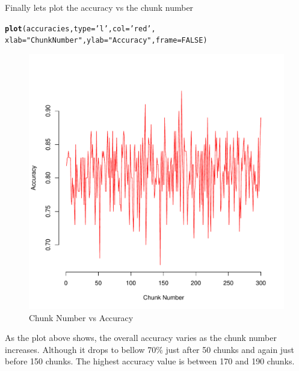 \documentclass[10pt  ,usenames, dvipsnames]{article}\usepackage[]{graphicx}\usepackage[]{color}
\makeatletter
\def\maxwidth{ %
  \ifdim\Gin@nat@width>\linewidth
    \linewidth
  \else
    \Gin@nat@width
  \fi
}
\newcommand{\hlnum}[1]{\textcolor[rgb]{0.686,0.059,0.569}{#1}}%
\newcommand{\hlstr}[1]{\textcolor[rgb]{0.192,0.494,0.8}{#1}}%
\newcommand{\hlstd}[1]{\textcolor[rgb]{0.345,0.345,0.345}{#1}}%
\newcommand{\hlkwc}[1]{\textcolor[rgb]{0.333,0.667,0.333}{#1}}%
\newcommand{\hlkwd}[1]{\textcolor[rgb]{0.737,0.353,0.396}{\textbf{#1}}}%
\newenvironment{kframe}{%
 \def\at@end@of@kframe{}%
 \ifinner\ifhmode%
  \def\at@end@of@kframe{\end{minipage}}%
  \begin{minipage}{\columnwidth}%
 \fi\fi%
 \def\FrameCommand##1{\hskip\@totalleftmargin \hskip-\fboxsep
 \colorbox{shadecolor}{##1}\hskip-\fboxsep
     \hskip-\linewidth \hskip-\@totalleftmargin \hskip\columnwidth}%
 \MakeFramed {\advance\hsize-\width
   \@totalleftmargin\z@ \linewidth\hsize
   \@setminipage}}%
 {\par\unskip\endMakeFramed%
 \at@end@of@kframe}
\newenvironment{knitrout}{}{} %
\makeatother
\begin{document}
Finally lets plot the accuracy vs the chunk number

\begin{knitrout}
\color{fgcolor}\begin{kframe}
\begin{alltt}
\hlkwd{plot}\hlstd{(accuracies,}\hlkwc{type}\hlstd{=}\hlstr{'l'}\hlstd{,}\hlkwc{col}\hlstd{=}\hlstr{'red'}\hlstd{,}
     \hlkwc{xlab}\hlstd{=}\hlstr{"Chunk Number"}\hlstd{,}\hlkwc{ylab}\hlstd{=}\hlstr{"Accuracy"}\hlstd{,}\hlkwc{frame}\hlstd{=}\hlnum{FALSE}\hlstd{)}
\end{alltt}
\end{kframe}
\end{knitrout}


\begin{figure}[H]
\begin{center}
\begin{knitrout}
\color{fgcolor}
\includegraphics[width=\maxwidth]{figure/unnamed-chunk-65-1} 

\end{knitrout}
\caption {Chunk Number vs Accuracy}
\label{fig2}
\end {center}
\end {figure}

As the plot above shows, the overall accuracy varies as the chunk number increases. Although it drops to bellow 70\% just after 50 chunks and again just before 150 chunks. The highest accuracy value is between 170 and 190 chunks.
\end{document}
